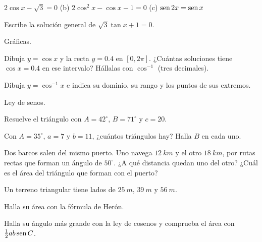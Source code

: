 \documentclass[11pt,a4paper]{article}
\begin{document}
\begin{ejercicios}
\begin{ejercicios}
  \item $2\cos x-\sqrt3=0$ \quad (b) $2\cos^2x-\cos x-1=0$ \quad (c) $\operatorname{sen}2x=\operatorname{sen} x$
  \setcounter{ejerciciosii}{3}
  \item Escribe la solución general de $\sqrt3\tan x+1=0$.
  \end{ejercicios}
\item Gráficas.
  \begin{ejercicios}
  \item Dibuja $y=\cos x$ y la recta $y=0.4$ en $[0,2\pi]$. ¿Cuántas soluciones tiene $\cos x=0.4$ en ese intervalo? Hállalas con $\cos^{-1}$ (tres decimales).
  \item Dibuja $y=\cos^{-1}x$ e indica su dominio, su rango y los puntos de sus extremos.
  \end{ejercicios}
\item Ley de senos.
  \begin{ejercicios}
  \item Resuelve el triángulo con $A=42^\circ$, $B=71^\circ$ y $c=20$.
  \item Con $A=35^\circ$, $a=7$ y $b=11$, ¿cuántos triángulos hay? Halla $B$ en cada uno.
  \end{ejercicios}
\item Dos barcos salen del mismo puerto. Uno navega $\SI{12}{km}$ y el otro $\SI{18}{km}$, por rutas rectas que forman un ángulo
  de $50^\circ$. ¿A qué distancia quedan uno del otro? ¿Cuál es el área del triángulo que forman con el puerto?
\item Un terreno triangular tiene lados de $\SI{25}{m}$, $\SI{39}{m}$ y $\SI{56}{m}$.
  \begin{ejercicios}
  \item Halla su área con la fórmula de Herón.
  \item Halla su ángulo más grande con la ley de cosenos y comprueba el área con $\tfrac12ab\operatorname{sen} C$.
  \end{ejercicios}
\end{ejercicios}
\end{document}
